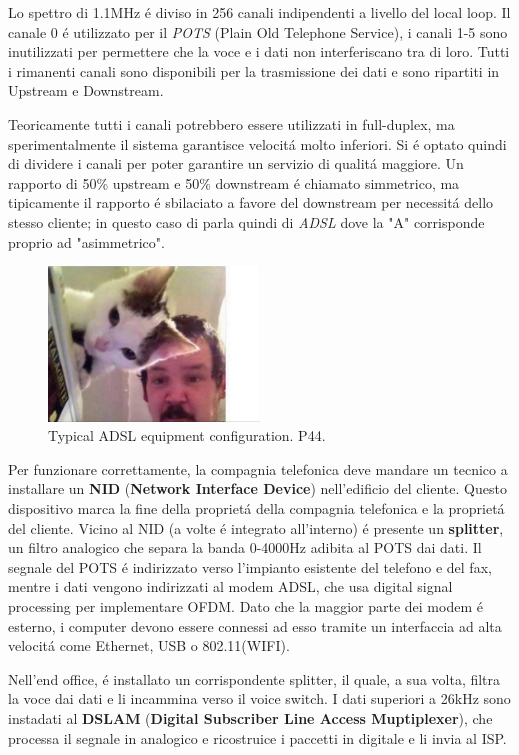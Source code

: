 \documentclass[../ComputerNetworks.tex]{subfiles}
\begin{document}
Lo spettro di 1.1MHz é diviso in 256 canali indipendenti a livello del local loop.
Il canale 0 é utilizzato per il \emph{POTS} (Plain Old Telephone Service), i canali 1-5 sono inutilizzati per permettere che la voce e i dati non interferiscano tra di loro.
Tutti i rimanenti canali sono disponibili per la trasmissione dei dati e sono ripartiti in Upstream e Downstream.

Teoricamente tutti i canali potrebbero essere utilizzati in full-duplex, ma sperimentalmente il sistema garantisce velocitá molto inferiori.
Si é optato quindi di dividere i canali per poter garantire un servizio di qualitá maggiore.
Un rapporto di 50\% upstream e 50\% downstream é chiamato simmetrico, ma tipicamente il rapporto é sbilaciato a favore del downstream per necessitá dello stesso cliente; in questo caso di parla quindi di \emph{ADSL} dove la "A" corrisponde proprio ad "asimmetrico".

\begin{figure}[h]
    \centering
    \includegraphics[width=0.5\textwidth]{img/ADSLeq.jpg}
    \caption{Typical ADSL equipment configuration. P44.}
\end{figure}

Per funzionare correttamente, la compagnia telefonica deve mandare un tecnico a installare un \textbf{NID} (\textbf{Network Interface Device}) nell’edificio del cliente.
Questo dispositivo marca la fine della proprietá della compagnia telefonica e la proprietá del cliente.
Vicino al NID (a volte é integrato all’interno) é presente un \textbf{splitter}, un filtro analogico che separa la banda 0-4000Hz adibita al POTS dai dati.
Il segnale del POTS é indirizzato verso l’impianto esistente del telefono e del fax, mentre i dati vengono indirizzati al modem ADSL, che usa digital signal processing per implementare OFDM.
Dato che la maggior parte dei modem é esterno, i computer devono essere connessi ad esso tramite un interfaccia ad alta velocitá come Ethernet, USB o 802.11(WIFI).

Nell’end office, é installato un corrispondente splitter, il quale, a sua volta, filtra la voce dai dati e li incammina verso il voice switch.
I dati superiori a 26kHz sono instadati al \textbf{DSLAM} (\textbf{Digital Subscriber Line Access Muptiplexer}), che processa il segnale in analogico e ricostruice i paccetti in digitale e li invia al ISP.
\end{document}
